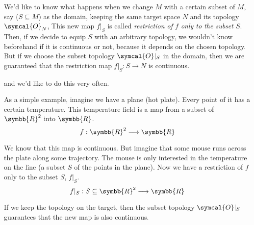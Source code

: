    We'd like to know what happens when we change $M$ with a certain subset of
   $M$, say ($S\subseteq M$) as the domain, keeping the same target space $N$
   and its topology $\symcal{O}_N$, This new map $f|_S$ is called
   \emph{restriction of $f$ only to the subset $S$}.
   Then, if we decide to equip $S$ with an arbitrary topology, we wouldn't know
   beforehand if it
   is continuous or not, because it depends on the chosen topology.
   But if we choose the subset topology $\symcal{O}|_S$ in the domain, then we
   are guaranteed that the restriction map $f|_S : S \longrightarrow N$ is
   continuous.
   \vspace{-1.0ex}
   \begin{center}
     \def\scl{1}
     \centering
   \end{center}
   and we'd like to do this very often.

   As a simple example, imagine we have a plane (hot plate). Every point of it
   has a certain temperature. This temperature field is a map from a subset of
   $\symbb{R}^2$ into $\symbb{R}$.
   \[
     f : \symbb{R}^2 \longrightarrow \symbb{R}
   \]

   We know that this map is continuous. But imagine that some mouse runs across
   the plate along some trajectory. The mouse is only interested in the
   temperature on the line (a subset $S$ of the points in the plane). Now we
   have a restriction of $f$ only to the subset $S$, $f|_S$.
   \[
     f|_S : S\subseteq\symbb{R}^2 \longrightarrow \symbb{R}
   \]

   If we keep the topology on the target, then the subset topology
   $\symcal{O}|_S$ guarantees that the new map is also continuous.
 






